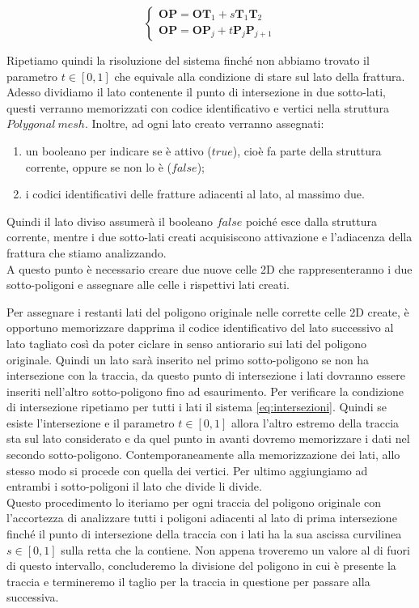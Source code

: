 \documentclass[a4paper]{article}
\newcommand{\B}{\mathbf}
\begin{document}
\begin{equation}
\begin{cases}
\B{OP}=\B{OT}_1+s\B{T}_1\B{T}_{2} \\ 
\B{OP}=\B{OP}_j+t\B{P}_j\B{P}_{j+1}
\end{cases}
\label{eq:intersezioni}
\end{equation}

Ripetiamo quindi la risoluzione del sistema finché non abbiamo trovato il parametro $t \in [0,1]$ che equivale alla condizione di stare sul lato della frattura. \\

Adesso dividiamo il lato contenente il punto di intersezione in due sotto-lati, questi verranno memorizzati con codice identificativo e vertici nella struttura $Polygonal \ mesh$. Inoltre, ad ogni lato creato verranno assegnati: 
\begin{enumerate} 
\item un booleano per indicare se è attivo ($true$), cioè fa parte della struttura corrente, oppure se non lo è ($false$);
\item i codici identificativi delle fratture adiacenti al lato, al massimo due.
\end{enumerate}

Quindi il lato diviso assumerà il booleano $false$ poiché esce dalla struttura corrente, mentre i due sotto-lati creati acquisiscono attivazione e l'adiacenza della frattura che stiamo analizzando. \\
A questo punto è necessario creare due nuove celle 2D che rappresenteranno i due sotto-poligoni e assegnare alle celle i rispettivi lati creati. 

Per assegnare i restanti lati del poligono originale nelle corrette celle 2D create, è opportuno memorizzare dapprima il codice identificativo del lato successivo al lato tagliato così da poter ciclare in senso antiorario sui lati del poligono originale. 
Quindi un lato sarà inserito nel primo sotto-poligono se non ha intersezione con la traccia, da questo punto di intersezione i lati dovranno essere inseriti nell'altro sotto-poligono fino ad esaurimento. Per verificare la condizione di intersezione ripetiamo per tutti i lati il sistema \eqref{eq:intersezioni}. Quindi se esiste l'intersezione e il parametro $t \in [0,1]$ allora l'altro estremo della traccia sta sul lato considerato e da quel punto in avanti dovremo memorizzare i dati nel secondo sotto-poligono. Contemporaneamente alla memorizzazione dei lati, allo stesso modo si procede con quella dei vertici. Per ultimo aggiungiamo ad entrambi i sotto-poligoni il lato che divide li divide.
\\[2mm]
Questo procedimento lo iteriamo per ogni traccia del poligono originale con l'accortezza di analizzare tutti i poligoni adiacenti al lato di prima intersezione finché il punto di intersezione della traccia con i lati ha la sua ascissa curvilinea $s \in [0,1]$ sulla retta che la contiene. Non appena troveremo un valore al di fuori di questo intervallo, concluderemo la divisione del poligono in cui è presente la traccia e termineremo il taglio per la traccia in questione per passare alla successiva.
\end{document}

